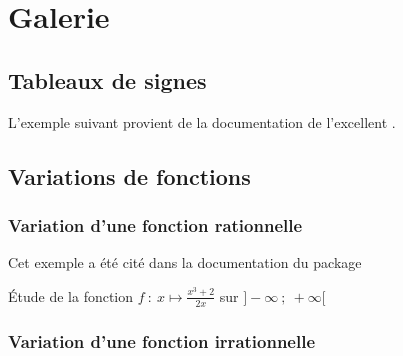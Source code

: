 \section{Galerie}
\subsection{Tableaux de signes}
L'exemple suivant provient de la documentation de l'excellent .


\medskip


\begin{tkzexample}
\end{tkzexample}
 

\subsection{Variations de fonctions}
 \subsubsection{Variation d'une fonction rationnelle}
 
 Cet exemple a été cité dans la documentation du package 

 Étude de la fonction $f~:~ x \longmapsto \frac{x^3+2}{2x}$ sur $]-\infty~;~+\infty[$
 
\begin{tkzexample}
\end{tkzexample}  


\subsubsection{Variation d'une fonction irrationnelle}
 
